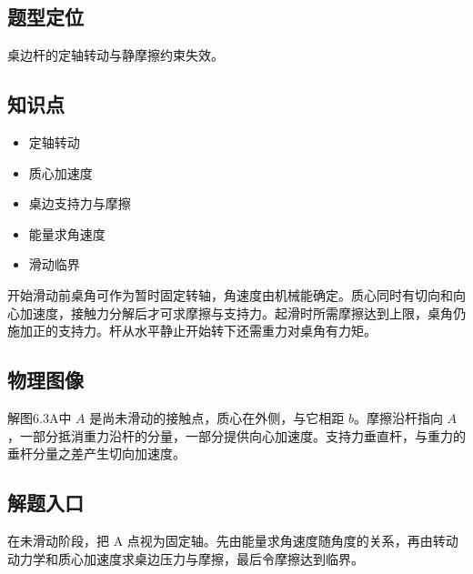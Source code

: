 \documentclass[UTF8,fontset=fandol,a4paper,11pt]{ctexart}
\providecommand{\tightlist}{\setlength{\itemsep}{0pt}\setlength{\parskip}{0pt}}
\begin{document}


\subsection*{题型定位}

桌边杆的定轴转动与静摩擦约束失效。



\subsection*{知识点}

\begin{itemize}
\tightlist
\item
  定轴转动
\item
  质心加速度
\item
  桌边支持力与摩擦
\item
  能量求角速度
\item
  滑动临界
\end{itemize}

开始滑动前桌角可作为暂时固定转轴，角速度由机械能确定。质心同时有切向和向心加速度，接触力分解后才可求摩擦与支持力。起滑时所需摩擦达到上限，桌角仍施加正的支持力。杆从水平静止开始转下还需重力对桌角有力矩。




\subsection*{物理图像}

解图6.3A中 $A$ 是尚未滑动的接触点，质心在外侧，与它相距 $b$。摩擦沿杆指向 $A$，一部分抵消重力沿杆的分量，一部分提供向心加速度。支持力垂直杆，与重力的垂杆分量之差产生切向加速度。



\subsection*{解题入口}

在未滑动阶段，把 A
点视为固定轴。先由能量求角速度随角度的关系，再由转动动力学和质心加速度求桌边压力与摩擦，最后令摩擦达到临界。
\end{document}
